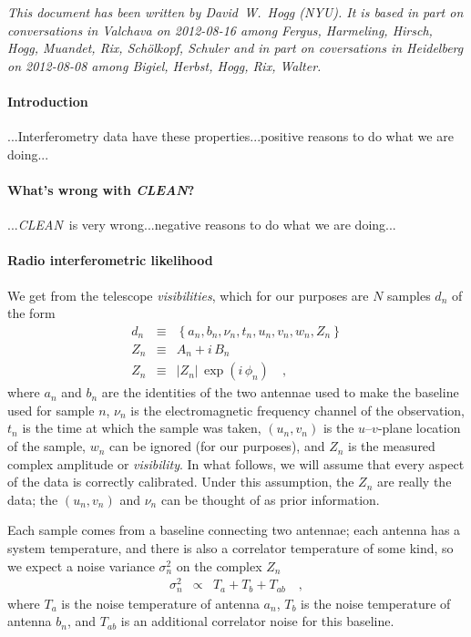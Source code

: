 \documentclass[12pt]{article}
\newcommand{\project}[1]{\textsl{#1}}
\newcommand{\CLEAN}{\project{CLEAN}}
\newcommand{\set}[1]{\left\{{#1}\right\}}
\begin{document}
\textsl{This document has been written by David~W.~Hogg (NYU).  It is
  based in part on conversations in Valchava on 2012-08-16 among
  Fergus, Harmeling, Hirsch, Hogg, Muandet, Rix, Sch\"olkopf, Schuler
  and in part on coversations in Heidelberg on 2012-08-08 among
  Bigiel, Herbst, Hogg, Rix, Walter.}

\paragraph{Introduction}

...Interferometry data have these properties...positive reasons to do
what we are doing...

\paragraph{What's wrong with \CLEAN?}

...\CLEAN\ is very wrong...negative reasons to do what we are doing...

\paragraph{Radio interferometric likelihood}

We get from the telescope \emph{visibilities}, which for our purposes
are $N$ samples $d_n$ of the form
\begin{eqnarray}
d_n &\equiv& \set{a_n, b_n, \nu_n, t_n, u_n, v_n, w_n, Z_n}
\\
Z_n &\equiv& A_n + i\,B_n
\\
Z_n &\equiv& \left|Z_n\right|\,\exp(i\,\phi_n)
\quad,
\end{eqnarray}
where $a_n$ and $b_n$ are the identities of the two antennae used to
make the baseline used for sample $n$, $\nu_n$ is the electromagnetic
frequency channel of the observation, $t_n$ is the time at which the
sample was taken, $(u_n, v_n)$ is the $u$--$v$-plane location of the
sample, $w_n$ can be ignored (for our purposes), and $Z_n$ is the
measured complex amplitude or \emph{visibility}.  In what follows, we
will assume that every aspect of the data is correctly calibrated.
Under this assumption, the $Z_n$ are really the data; the $(u_n,
v_n)$ and $\nu_n$ can be thought of as prior information.

Each sample comes from a baseline connecting two antennae; each
antenna has a system temperature, and there is also a correlator
temperature of some kind, so we expect a noise variance $\sigma_n^2$
on the complex $Z_n$
\begin{eqnarray}
\sigma_n^2 &\propto& T_a + T_b + T_{ab}
\quad ,
\end{eqnarray}
where $T_a$ is the noise temperature of antenna $a_n$, $T_b$ is the
noise temperature of antenna $b_n$, and $T_{ab}$ is an additional
correlator noise for this baseline.
\end{document}
